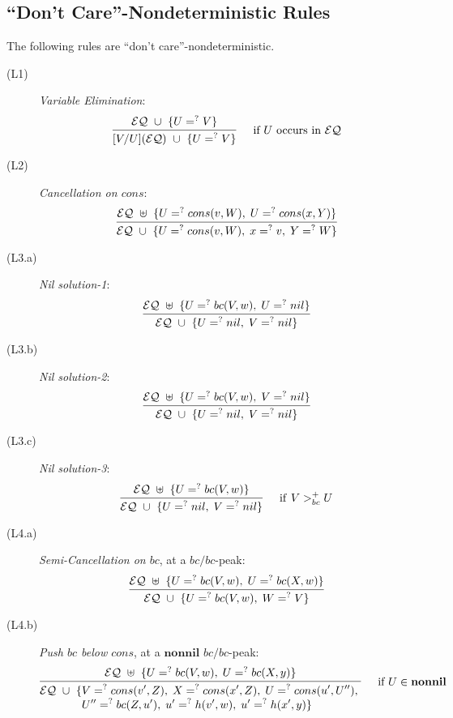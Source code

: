\documentclass[11pt]{article}
\newcommand{\ueq}{=_{}^?}
\newcommand{\EQ}{\mathcal{EQ}}
\newcommand{\Nonnil}{\mathbf{nonnil}}
\begin{document}
\subsection{\texorpdfstring{``Don't Care''}{"Don't Care"}-Nondeterministic Rules}

The following rules are ``don't care''-nondeterministic.
\begin{description}
    \item[(L1)] {\em Variable Elimination}:
        \[\infer[\quad \text{if } U \text{ occurs in } \EQ ]
            {[V/U](\EQ) ~ \cup ~ \{U \ueq V\} }
            { \EQ ~ \cup ~ \{U \ueq V\} }
        \]

    \item[(L2)] {\em Cancellation on $cons$}:
        \[\infer
            {\EQ ~ \cup ~ \{ U \ueq cons(v, W), \; x \ueq v, \; Y \ueq W \}}
            {\EQ ~ \uplus ~ \{ U \ueq cons(v, W), \; U \ueq cons(x, Y) \}}
        \]

    \item[(L3.a)] {\em Nil solution-1}:
        \[\infer
            {\EQ ~ \cup ~ \{ U \ueq nil, \; V \ueq nil \}}
            {\EQ ~ \uplus ~ \{ U \ueq bc(V, w), \; U \ueq nil \}}
        \]

    \item[(L3.b)] {\em Nil solution-2}:
        \[\infer
            {\EQ ~ \cup ~ \{ U \ueq nil, \; V \ueq nil \}}
            {\EQ ~ \uplus ~ \{ U \ueq bc(V, w), \; V \ueq nil \}}
        \]

    \item[(L3.c)] {\em Nil solution-3}:
        \[\infer[\quad \mathrm{if} ~ V >_{bc}^{+} U ]
            {\EQ ~ \cup ~ \{ U \ueq nil, \; V \ueq nil \}}
            {\EQ ~ \uplus ~ \{ U \ueq bc(V, w) \}}
        \]

    \item[(L4.a)] {\em Semi-Cancellation on $bc$}, at a $bc/bc$-peak:
        \[\infer
            {\EQ ~ \cup ~ \{U \ueq bc(V, w), \; W \ueq V \}}
            {\EQ ~ \uplus ~ \{ U \ueq bc(V, w), \; U \ueq bc(X, w) \}}
        \]

    \item[(L4.b)] {\em Push $bc$ below $cons$}, at a $\mathbf{nonnil}$ $bc/bc$-peak:
        \[\infer[\quad \text{if } U \in \Nonnil]
            {\begin{aligned}
                \EQ ~ \cup ~ \{
                & V \ueq cons(v', Z), \; X \ueq cons(x', Z), \;
                  U \ueq cons(u', U''), \; \\[-4pt]
                & U'' \ueq bc(Z, u'), \; u' \ueq h(v', w), \; u' \ueq h(x', y) \}
            \end{aligned}}
            {\EQ ~ \uplus ~ \{ U \ueq bc(V, w), \; U \ueq bc(X, y) \}}
        \]


\end{description}
\end{document}
